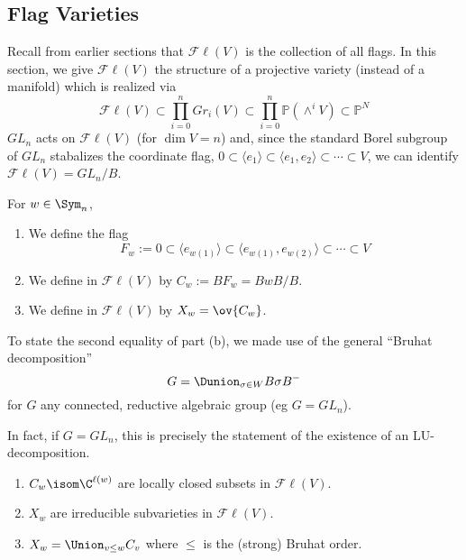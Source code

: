 \documentclass[11pt,leqno,oneside]{amsbook}
\renewcommand{\P}{\mathbb{P}}
\numberwithin{thm}{section}
\newcommand{\Fl}{\mathcal{F\ell}}
\newcommand{\Gr}{Gr}
\begin{document}
\subsection{Flag Varieties}
Recall from earlier sections that \(\Fl(V)\) is the collection of all
flags. In this section, we give \(\Fl(V)\) the structure of a
projective variety 
(instead of a manifold) which is realized via \[
  \Fl(V) \subset \prod_{i=0}^n \Gr_i(V) \subset \prod_{i=0}^n
  \P(\wedge^i V) \subset \P^N
\]
\(GL_n\) acts on \(\Fl(V)\) (for \(\dim V = n\)) and, since the
standard Borel subgroup of \(GL_n\) stabalizes 
the coordinate flag, \(0 \subset \langle e_1 \rangle \subset \langle
e_1, e_2 \rangle \subset \cdots \subset V\), we can identify \(\Fl(V)
= GL_n/B\).
\begin{defn}
  For \(w \in \Sym_n\),
  \begin{enumerate}
  \item We define the flag
    \[ F_w := 0 \subset \langle e_{w(1)} \rangle \subset \langle
      e_{w(1)}, e_{w(2)} \rangle \subset \cdots \subset V
    \]
  \item We define  in \(\Fl(V)\) by \(C_w := BF_w =
    BwB/B\).
  \item We define  in \(\Fl(V)\) by \(X_w =
    \ov{C_w}\).
  \end{enumerate}
\end{defn}
\begin{rmk}
  To state the second equality of part (b), we made use of the general
  ``Bruhat decomposition'' \[ 
    G = \Dunion_{\sigma \in W} B \sigma B^-
  \]
  for \(G\) any connected, reductive algebraic group (eg \(G =
  GL_n\)).

  In fact, if \(G = GL_n\), this is precisely the statement of the
  existence of an LU-decomposition. 
\end{rmk}
\begin{prop}
  \begin{enumerate}
  \item \(C_w \isom \C^{\ell(w)}\) are locally closed subsets in
    \(\Fl(V)\).
  \item \(X_w\) are irreducible subvarieties in \(\Fl(V)\).
  \item \(X_w = \Union_{v \leq w} C_v\) where \(\leq\) is the (strong)
    Bruhat order. 
  \end{enumerate}
\end{prop}
\end{document}
